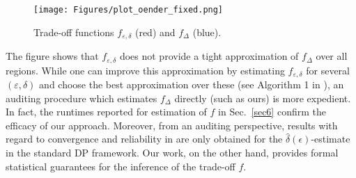 \begin{figure}
\centering
\texttt{[image: Figures/plot\_oender\_fixed.png]}
\caption{Trade-off functions $f_{\varepsilon, \delta}$ (red) and $f_{\Delta}$ (blue).} 
\label{Fig_f_epsilon_delta}
\end{figure}

The figure shows that $f_{\varepsilon,\delta}$ does not provide a tight approximation of $f_{\Delta}$ over all regions. 
While one can improve this approximation by estimating $f_{\varepsilon,\delta}$ for several $(\varepsilon, \delta)$ and choose the best approximation over these (see Algorithm 1 in \cite{Koskela2024}), %
an auditing procedure which estimates $f_{\Delta}$ directly (such as ours) is more expedient. 
In fact, the runtimes reported for estimation of $f$ in Sec.~\ref{sec6} confirm the efficacy of our approach. Moreover, from an auditing perspective, results with regard to convergence and reliability in \cite{Koskela2024} are only obtained for the $\hat{\delta}(\epsilon)$-estimate in the standard DP framework. Our work, on the other hand, provides formal statistical guarantees for the inference of the trade-off $f$.%


